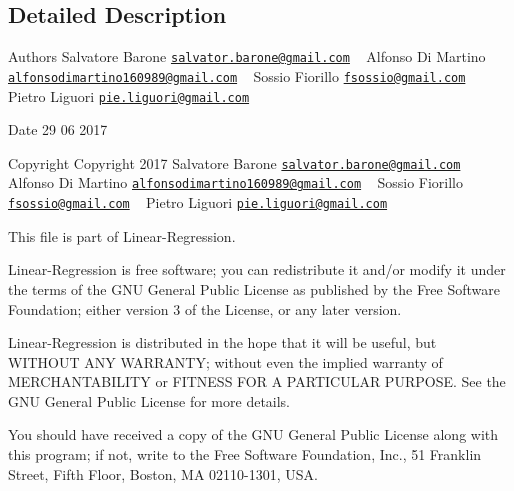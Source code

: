 \subsection{Detailed Description}
\begin{DoxyAuthor}{Authors}
Salvatore Barone \href{mailto:salvator.barone@gmail.com}{\tt salvator.\+barone@gmail.\+com} ~\newline
 Alfonso Di Martino \href{mailto:alfonsodimartino160989@gmail.com}{\tt alfonsodimartino160989@gmail.\+com} ~\newline
 Sossio Fiorillo \href{mailto:fsossio@gmail.com}{\tt fsossio@gmail.\+com} ~\newline
 Pietro Liguori \href{mailto:pie.liguori@gmail.com}{\tt pie.\+liguori@gmail.\+com} ~\newline

\end{DoxyAuthor}
\begin{DoxyDate}{Date}
29 06 2017
\end{DoxyDate}
\begin{DoxyCopyright}{Copyright}
Copyright 2017 Salvatore Barone \href{mailto:salvator.barone@gmail.com}{\tt salvator.\+barone@gmail.\+com} ~\newline
 Alfonso Di Martino \href{mailto:alfonsodimartino160989@gmail.com}{\tt alfonsodimartino160989@gmail.\+com} ~\newline
 Sossio Fiorillo \href{mailto:fsossio@gmail.com}{\tt fsossio@gmail.\+com} ~\newline
 Pietro Liguori \href{mailto:pie.liguori@gmail.com}{\tt pie.\+liguori@gmail.\+com} ~\newline

\end{DoxyCopyright}
This file is part of Linear-\/\+Regression.

Linear-\/\+Regression is free software; you can redistribute it and/or modify it under the terms of the G\+N\+U General Public License as published by the Free Software Foundation; either version 3 of the License, or any later version.

Linear-\/\+Regression is distributed in the hope that it will be useful, but W\+I\+T\+H\+O\+U\+T A\+N\+Y W\+A\+R\+R\+A\+N\+T\+Y; without even the implied warranty of M\+E\+R\+C\+H\+A\+N\+T\+A\+B\+I\+L\+I\+T\+Y or F\+I\+T\+N\+E\+S\+S F\+O\+R A P\+A\+R\+T\+I\+C\+U\+L\+A\+R P\+U\+R\+P\+O\+S\+E. See the G\+N\+U General Public License for more details.

You should have received a copy of the G\+N\+U General Public License along with this program; if not, write to the Free Software Foundation, Inc., 51 Franklin Street, Fifth Floor, Boston, M\+A 02110-\/1301, U\+S\+A. 